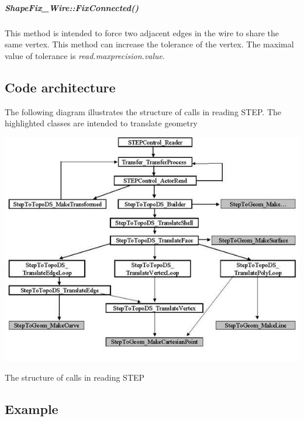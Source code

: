 \subparagraph*{Shape\+Fix\+\_\+\+Wire\+::\+Fix\+Connected()}

This method is intended to force two adjacent edges in the wire to share the same vertex. This method can increase the tolerance of the vertex. The maximal value of tolerance is {\itshape read.\+maxprecision.\+value}.\hypertarget{occt_user_guides__step_occt_step_2_6}{}\subsection{Code architecture}\label{occt_user_guides__step_occt_step_2_6}
The following diagram illustrates the structure of calls in reading S\+T\+EP. The highlighted classes are intended to translate geometry


\begin{DoxyImage}
\begin{center}
 \includegraphics[width=\textwidth,height=\textheight/2,keepaspectratio=true]{step_image003.png}
\end{center}
\caption{The structure of calls in reading S\+T\+EP}
\end{DoxyImage}
 \hypertarget{occt_user_guides__step_occt_step_2_7}{}\subsection{Example}\label{occt_user_guides__step_occt_step_2_7}

